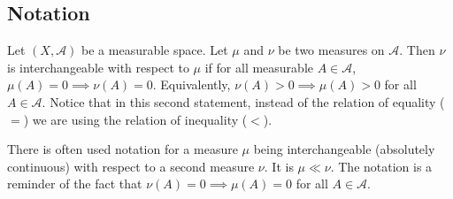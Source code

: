 \subsection*{Notation}

Let $(X, \mathcal{A} )$ be a measurable space.
Let $\mu $ and $\nu $ be two measures on $\mathcal{A} $.
Then $\nu $ is interchangeable with respect to $\mu $ if for all measurable $A \in \mathcal{A} $, $\mu (A) = 0 \implies \nu (A) = 0$.
Equivalently, $\nu (A) > 0 \implies \mu (A) > 0$ for all $A \in \mathcal{A} $.
Notice that in this second statement, instead of the relation of equality ($=$) we are using the relation of inequality ($<$).


There is often used notation for a measure $\mu $ being interchangeable (absolutely continuous) with respect to a second measure $\nu $.
It is $\mu  \ll \nu $.
The notation is a reminder of the fact that $\nu (A) = 0 \implies \mu (A) = 0$ for all $A \in \mathcal{A} $.

